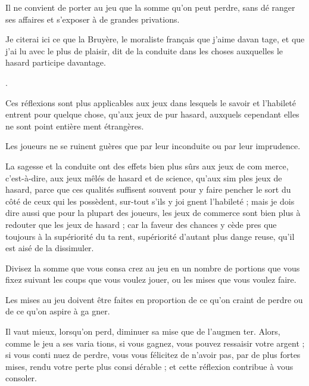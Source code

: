 Il ne convient de porter au jeu que
la somme qu'on peut perdre, sans dé%
ranger ses affaires et s'exposer à de
grandes privations.

Je citerai ici ce que la Bruyère, le
moraliste français que j'aime davan%
tage, et que j'ai lu avec le plus de
plaisir, dit de la conduite dans les
choses auxquelles le hasard participe
davantage.

.

Ces réflexions sont plus applicables
aux jeux dans lesquels le savoir et
l'habileté entrent pour quelque chose,
qu'aux jeux de pur hasard, auxquels
cependant elles ne sont point entière%
ment étrangères.

Les joueurs ne se ruinent guères
que par leur inconduite ou par leur
imprudence.

La sagesse et la conduite ont des
effets bien plus sûrs aux jeux de com%
merce, c'est-à-dire, aux jeux mêlés
de hasard et de science, qu'aux sim%
ples jeux de hasard, parce que ces
qualités suffisent souvent pour y
faire pencher le sort du côté de ceux
qui les possèdent, sur-tout s'ils y joi%
gnent l'habileté ; mais je dois dire
aussi que pour la plupart des joueurs,
les jeux de commerce sont bien plus
à redouter que les jeux de hasard ;
car la faveur des chances y cède  pres%
que toujours à la supériorité du ta%
rent, supériorité d'autant plus dange%
reuse, qu'il est aisé de la dissimuler.

Divisez la somme que vous consa%
crez au jeu en un nombre de portions
que vous fixez suivant les coups que
vous voulez jouer, ou les mises que
vous voulez faire.

Les mises au jeu doivent être faites
en proportion de ce qu'on craint de
perdre ou de ce qu'on aspire à ga%
gner.

Il vaut mieux, lorsqu'on perd,
diminuer sa mise que de l'augmen%
ter. Alors, comme le jeu a ses varia%
tions, si vous gagnez, vous pouvez
ressaisir votre argent ; si vous conti%
nuez de perdre, vous vous félicitez
de n'avoir pas, par de plus fortes
mises, rendu votre perte plus consi%
dérable ;  et cette réflexion contribue
à vous consoler.

